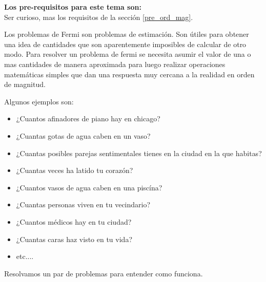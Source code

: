 \begin{prere}
\begin{tcolorbox}[colback=blue!5!white,colframe=blue!75!black,boxrule=0.5pt,arc=4pt, left=6pt,right=6pt,top=6pt,bottom=6pt,boxsep=0pt] 
  \textbf{Los pre-requisitos para este tema son:}\\
  Ser curioso, mas los requisitos de la secci\'on \ref{pre_ord_mag}.
\end{tcolorbox} 
\end{prere}
Los problemas de Fermi son problemas de estimaci\'on. Son \'utiles para obtener una idea de cantidades que son aparentemente imposibles de calcular de otro modo. Para resolver un problema de fermi se necesita asumir el valor de una o mas cantidades de manera aproximada para luego realizar operaciones matem\'aticas simples que dan una respuesta muy cercana a la realidad en orden de magnitud. 
\begin{example}
\begin{tcolorbox}[colback=green!5!white,colframe=green!75!black,boxrule=0.5pt,arc=4pt,left=6pt,right=6pt,top=6pt,bottom=6pt,boxsep=0pt]
Algunos ejemplos son:\\
\begin{itemize}
\item ¿Cuantos afinadores de piano hay en chicago?
\item ¿Cuantas gotas de agua caben en un vaso?
\item ¿Cuantas posibles parejas sentimentales tienes en la ciudad en la que habitas?
\item ¿Cuantas veces ha latido tu coraz\'on?
\item ¿Cuantos vasos de agua caben en una pisc\'ina?
\item ¿Cuantas personas viven en tu vecindario?
\item ¿Cuantos m\'edicos hay en tu ciudad?
\item ¿Cuantas caras haz visto en tu vida?
\item etc....
\end{itemize}
\end{tcolorbox}

\end{example}
Resolvamos un par de problemas para entender como funciona.\\
